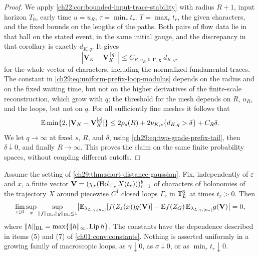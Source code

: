 \begin{proof}
We apply \cref{ch22:cor:bounded-input-trace-stability} with radius $R+1$, input horizon $T_0$, early time $u=u_R$, $\tau=\min_rt_r$, $T=\max_rt_r$, the given characters, and the fixed bounds on the lengths of the paths. Both pairs of flow data lie in that ball on the stated event, in the same initial gauge, and the discrepancy in that corollary is exactly $d_{K,q}$. It gives
\begin{equation}\label{ch29:eq:uniform-prefix-loop-modulus}
 |\mathbf V_K-\mathbf V_K^{[q]}|\le C_{R,u_R,\mathbf t,\boldsymbol\Gamma,\boldsymbol\chi}\,d_{K,q},
\end{equation}
for the whole vector of characters, including the normalized fundamental traces. The constant in \eqref{ch29:eq:uniform-prefix-loop-modulus} depends on the radius and on the fixed waiting time, but not on the higher derivatives of the finite-scale reconstruction, which grow with $q$; the threshold for the mesh depends on $R$, $u_R$, and the loops, but not on $q$. For all sufficiently fine meshes it follows that
\begin{equation}\label{ch29:eq:prefix-error-with-radius}
 \mathbb E\min\{2,|\mathbf V_K-\mathbf V_K^{[q]}|\}\le2\rho_s(R)+2\nu_{K,s}\{d_{K,q}>\delta\}+C_R\delta.
\end{equation}
We let $q\to\infty$ at fixed $s$, $R$, and $\delta$, using \eqref{ch29:eq:two-grade-prefix-tail}, then $\delta\downarrow0$, and finally $R\to\infty$. This proves the claim on the same finite probability spaces, without coupling different cutoffs.
\end{proof}

\begin{theorem}\label{ch29:thm:short-distance-macroscopic-mixing}
Assume the setting of \cref{ch29:thm:short-distance-gaussian}. Fix, independently of $\varepsilon$ and $x$, a finite vector $\mathbf V=(\chi_r(\operatorname{Hol}_{\Gamma_r}X(t_r)))_{r=1}^b$ of characters of holonomies of the trajectory $X$ around piecewise $C^1$ closed loops $\Gamma_r$ in $\mathbb T_L^3$ at times $t_r>0$. Then
\begin{equation}\label{ch29:eq:short-distance-macroscopic-mixing}
 \lim_{\varepsilon\downarrow0}\sup_x\sup_{\|f\|_{\rm BL},\|g\|_{\rm BL}\le1}\bigl|\mathbb E_{\lambda_{L,\gamma,[n_*]}}[f(Z_\varepsilon(x))g(\mathbf V)]-\mathbb E f(Z_G)\,\mathbb E_{\lambda_{L,\gamma,[n_*]}}g(\mathbf V)\bigr|=0,
\end{equation}
where $\|h\|_{\rm BL}=\max\{\|h\|_\infty,\operatorname{Lip} h\}$. The constants have the dependence described in items (5) and (7) of \cref{ch01:conv:constants}. Nothing is asserted uniformly in a growing family of macroscopic loops, as $\gamma\downarrow0$, as $\sigma\downarrow0$, or as $\min_rt_r\downarrow0$.
\end{theorem}

